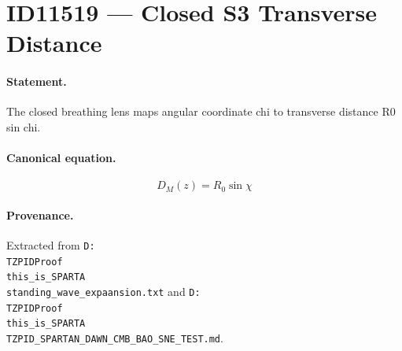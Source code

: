 \section*{ID11519 --- Closed S3 Transverse Distance}

\paragraph{Statement.}
The closed breathing lens maps angular coordinate chi to transverse distance R0 sin chi.

\paragraph{Canonical equation.}
\[
D_M(z)=R_0\sin\chi
\]

\paragraph{Provenance.}
Extracted from \texttt{D:\\TZPIDProof\\this\_is\_SPARTA\\standing\_wave\_expaansion.txt} and \texttt{D:\\TZPIDProof\\this\_is\_SPARTA\\TZPID\_SPARTAN\_DAWN\_CMB\_BAO\_SNE\_TEST.md}.

